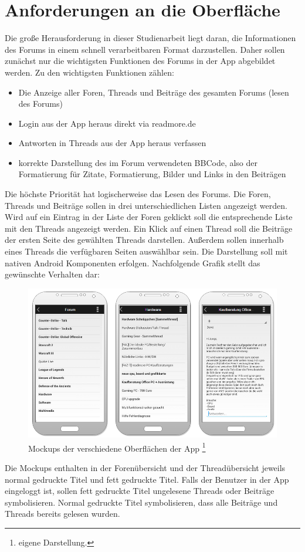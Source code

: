 \section{Anforderungen an die Oberfläche}
Die große Herausforderung in dieser Studienarbeit liegt daran, die Informationen
des Forums in einem schnell verarbeitbaren Format darzustellen. Daher sollen
zunächst nur die wichtigsten Funktionen des Forums in der App abgebildet werden.
Zu den wichtigsten Funktionen zählen:
\begin{itemize}
  \item Die Anzeige aller Foren, Threads und Beiträge des gesamten Forums
  (lesen des Forums)
  \item Login aus der App heraus direkt via readmore.de
  \item Antworten in Threads aus der App heraus verfassen
  \item korrekte Darstellung des im Forum verwendeten BBCode, also der
  Formatierung für Zitate, Formatierung, Bilder und Links in den Beiträgen
\end{itemize}
Die höchste Priorität hat logischerweise das Lesen des Forums. Die Foren,
Threads und Beiträge sollen in drei unterschiedlichen Listen angezeigt werden.
Wird auf ein Eintrag in der Liste der Foren geklickt soll die entsprechende
Liste mit den Threads angezeigt werden. Ein Klick auf einen Thread soll die
Beiträge der ersten Seite des gewählten Threads darstellen. Außerdem sollen
innerhalb eines Threads die verfügbaren Seiten auswählbar sein. Die Darstellung
soll mit nativen Android Komponenten erfolgen.
Nachfolgende Grafik stellt das gewünschte Verhalten dar:
\begin{figure}[!htbp]
\centering
\includegraphics[width=\textwidth]{Bilder/mockups_oberflaeche.png}
\caption[Mockups der verschiedene Oberflächen der App]{Mockups der verschiedene Oberflächen der App
\protect\footnote{eigene Darstellung.} }
\label{dminfo}
\end{figure}
Die Mockups enthalten in der Forenübersicht und der Threadübersicht jeweils
normal gedruckte Titel und fett gedruckte Titel. Falls der Benutzer in der App
eingeloggt ist, sollen fett gedruckte Titel ungelesene Threads oder Beiträge
symbolisieren. Normal gedruckte Titel symbolisieren, dass alle Beiträge und
Threads bereits gelesen wurden.
